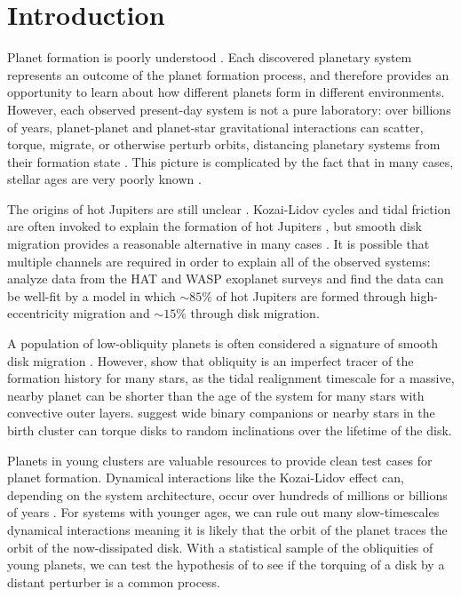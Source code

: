 \documentclass[twocolumn]{aastex63}
\begin{document}


 
\section{Introduction} \label{sec:intro}

Planet formation is poorly understood \citep[e.g.][]{Morbidelli16}. 
Each discovered planetary system represents an outcome of the planet formation process, and therefore provides an opportunity to learn about how different planets form in different environments. 
However, each observed present-day system is not a pure laboratory: over billions of years, planet-planet and planet-star gravitational interactions can scatter, torque, migrate, or otherwise perturb orbits, distancing planetary systems from their formation state \citep{Kozai62, Lidov62, Fabrycky07, Chatterjee08}. 
This picture is complicated by the fact that in many cases, stellar ages are very poorly known \citep[e.g.][]{Barnes07, Soderblom10}.

The origins of hot Jupiters are still unclear \citep{Dawson18}.
Kozai-Lidov cycles and tidal friction are often invoked to explain the formation of hot Jupiters \citep{Fabrycky07}, but smooth disk migration provides a reasonable alternative in many cases \citep{Ida08}. 
It is possible that multiple channels are required in order to explain all of the observed systems: \citet{Nelson17} analyze data from the HAT and WASP exoplanet surveys and find the data can be well-fit by a model in which $\sim85\%$ of hot Jupiters are formed through high-eccentricity migration and $\sim15\%$ through disk migration.

A population of low-obliquity planets is often considered a signature of smooth disk migration \citep{Morton11a, Ford14}. However, \citet{Albrecht12} show that obliquity is an imperfect tracer of the formation history for many stars, as the tidal realignment timescale for a massive, nearby planet can be shorter than the age of the system for many stars with convective outer layers.
\citet{Batygin12} suggest wide binary companions or nearby stars in the birth cluster can torque disks to random inclinations over the lifetime of the disk. 


Planets in young clusters are valuable resources to provide clean test cases for planet formation. 
Dynamical interactions like the Kozai-Lidov effect can, depending on the system architecture, occur over hundreds of millions or billions of years \citep{Montet15c, Naoz16}. 
For systems with younger ages, we can rule out many slow-timescales dynamical interactions meaning it is likely that the orbit of the planet traces the orbit of the now-dissipated disk. 
With a statistical sample of the obliquities of young planets, we can test the hypothesis of \citet{Batygin12} to see if the torquing of a disk by a distant perturber is a common process.
\end{document}
